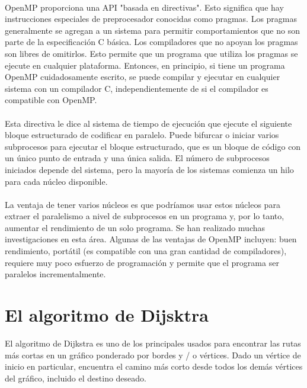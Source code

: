 \documentclass[11pt]{article}
\begin{document}
\paragraph{}
OpenMP proporciona una API "basada en directivas". Esto significa que hay instrucciones especiales de preprocesador conocidas como pragmas. Los pragmas generalmente se agregan a un sistema para permitir comportamientos que no son parte de la especificación C básica. Los compiladores que no apoyan los pragmas son libres de omitirlos. Esto permite que un programa que utiliza los pragmas se ejecute en cualquier plataforma. Entonces, en principio, si tiene un programa OpenMP cuidadosamente escrito, se puede compilar y ejecutar en cualquier sistema con un compilador C, independientemente de
si el compilador es compatible con OpenMP.

\paragraph{}
Esta directiva le dice al sistema de tiempo de ejecución que ejecute el siguiente bloque estructurado de codificar en paralelo. Puede bifurcar o iniciar varios subprocesos para ejecutar el bloque estructurado, que es un bloque de código con un único punto de entrada y una única salida. El número de subprocesos iniciados depende del sistema, pero la mayoría de los sistemas
comienza un hilo para cada núcleo disponible.

\paragraph{}
La ventaja de tener varios núcleos es que podríamos usar estos núcleos para extraer el paralelismo a nivel de subprocesos en un programa y, por lo tanto, aumentar el rendimiento de un solo programa. Se han realizado muchas investigaciones en esta área. Algunas de las ventajas de OpenMP incluyen: buen rendimiento, portátil (es compatible con una gran cantidad de compiladores), requiere muy poco esfuerzo de programación y permite que el programa ser paralelos incrementalmente.

\section{El algoritmo de Dijsktra}
El algoritmo de Dijkstra es uno de los principales usados para encontrar las rutas más cortas en un gráfico ponderado por bordes y / o vértices. Dado un vértice de inicio en particular, encuentra el camino más corto desde todos los demás vértices del gráfico, incluido el destino deseado. 
\end{document}
